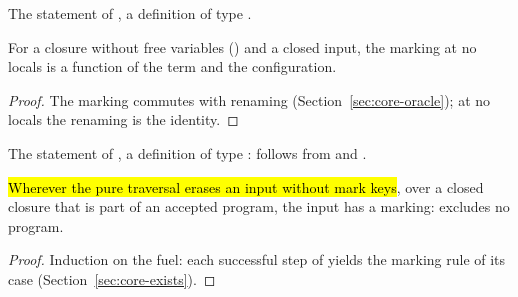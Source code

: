 \begin{definition}
  \label{def:EraseProof-markOf_det-statement}
  \leanok
   The statement of , a definition of type .
\end{definition}

\begin{lemma}
  \label{lem:EraseProof-markOf_det}
  \leanok
   For a closure without free variables () and a closed input, the marking at no locals is a function of the term and the configuration.
\end{lemma}
\begin{proof}
  \leanok
   The marking commutes with renaming (Section~\ref{sec:core-oracle}); at no locals the renaming is the identity.
\end{proof}

\begin{definition}
  \label{def:EraseProof-markOf_exists-statement}
  \leanok
   The statement of , a definition of type :  follows from  and .
\end{definition}

\begin{lemma}
  \label{lem:EraseProof-markOf_exists}
  \leanok
   \hl{Wherever the pure traversal erases an input without mark keys}, over a closed closure that is part of an accepted program, the input has a marking:  excludes no program.
\end{lemma}
\begin{proof}
  \leanok
   Induction on the fuel: each successful step of  yields the marking rule of its case (Section~\ref{sec:core-exists}).
\end{proof}

